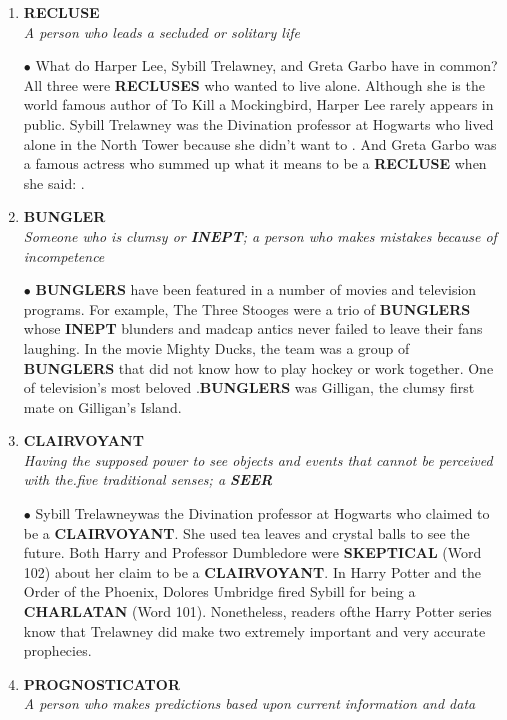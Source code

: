 \documentclass{book}
\begin{document}
\begin{enumerate}
\item \textbf{RECLUSE}\\
\textit{A person who leads a secluded or solitary life}

$ \bullet $ What do Harper Lee, Sybill Trelawney, and Greta
Garbo have in common? All three were \textbf{RECLUSES}
who wanted to live alone. Although she is the world famous author of To Kill a Mockingbird, Harper Lee
rarely appears in public. Sybill Trelawney was the
Divination professor at Hogwarts who lived alone in
the North Tower because she didn't want to . And Greta Garbo was a famous actress
who summed up what it means to be a \textbf{RECLUSE}
when she said: .

\item\textbf{BUNGLER}\\
\textit{Someone who is clumsy or \textbf{INEPT}; a person
who makes mistakes because of incompetence}

$ \bullet $ \textbf{BUNGLERS} have been featured in a number of
movies and television programs. For example, The
Three Stooges were a trio of \textbf{BUNGLERS} whose
\textbf{INEPT} blunders and madcap antics never failed to
leave their fans laughing. In the movie Mighty Ducks,
the team was a group of \textbf{BUNGLERS} that did not
know how to play hockey or work together. One of
television's most beloved .\textbf{BUNGLERS} was Gilligan,
the clumsy first mate on Gilligan's Island.

\item\textbf{ CLAIRVOYANT}\\
\textit{Having the supposed power to see objects and
events that cannot be perceived with the.five
traditional senses; a \textbf{SEER}}

$ \bullet $ Sybill Trelawneywas the Divination professor at Hogwarts who claimed to be a \textbf{CLAIRVOYANT}. She used
tea leaves and crystal balls to see the future. Both
Harry and Professor Dumbledore were \textbf{SKEPTICAL}
(Word 102) about her claim to be a \textbf{CLAIRVOYANT}.
In Harry Potter and the Order of the Phoenix,
Dolores Umbridge fired Sybill for being a \textbf{CHARLATAN} (Word 101). Nonetheless, readers ofthe Harry
Potter series know that Trelawney did make two
extremely important and very accurate prophecies.

 \item \textbf{PROGNOSTICATOR}\\
\textit{A person who makes predictions based upon
current information and data}


\end{enumerate}
\end{document}
